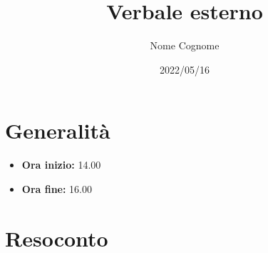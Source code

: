 \documentclass{classes/base}
\title{Verbale esterno}
\date{2022/05/16}
\author{Nome Cognome}
\renewcommand{\maketitle}{
    
}
\begin{document}
    \maketitle

    \section*{Generalità}
    \begin{itemize}
        \item \textbf{Ora inizio:} 14.00
        \item \textbf{Ora fine:} 16.00
    \end{itemize}

    \section*{Resoconto}
\end{document}
